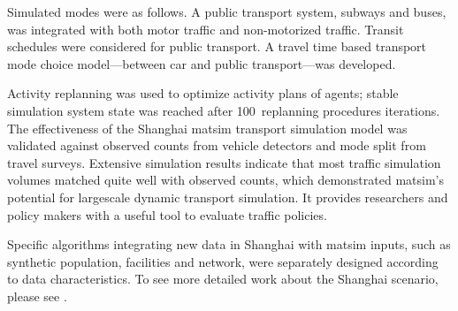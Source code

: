 Simulated modes were as follows. A public transport system, subways and buses, was integrated with both motor traffic and non-motorized traffic. Transit schedules were considered for public transport. A travel time based transport mode choice model---between car and public transport---was developed. %

Activity replanning was used to optimize activity plans of agents; stable simulation system state was reached after 100\, replanning procedures iterations. The effectiveness of the Shanghai \gls{matsim} transport simulation model was validated against observed counts from vehicle detectors and mode split from travel surveys. Extensive simulation results indicate that most traffic simulation volumes matched quite well with observed counts, which demonstrated \gls{matsim}'s potential for \gls{largescale} dynamic transport simulation. It provides researchers and policy makers with a useful tool to evaluate traffic policies. 

Specific algorithms integrating new data in Shanghai with \gls{matsim} inputs, such as synthetic population, facilities and network, were separately designed according to data characteristics. To see more detailed work about the Shanghai scenario, please see \citet[][]{ZhangLEtAl_TRR_2014}.

